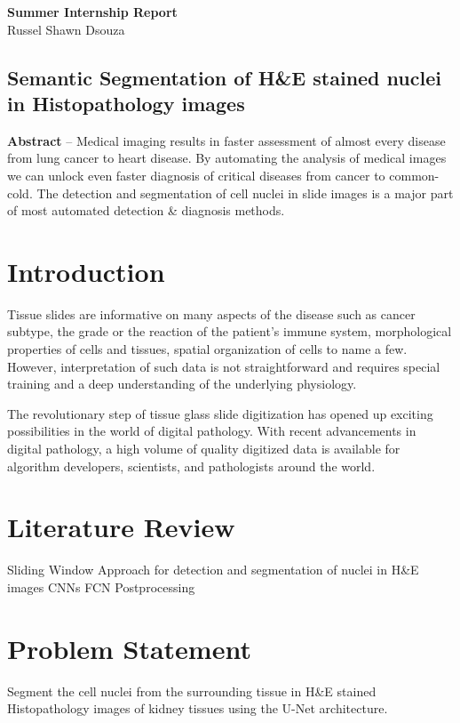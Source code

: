 \documentclass[11pt]{article}
\theoremstyle{definition}
\begin{document}
  \thispagestyle{empty}
  \begin{center}
    {\LARGE \bf Summer Internship Report}\\
    {\large Russel Shawn Dsouza}\\
  \end{center}
  
  \tableofcontents
  
  \newpage
  \begin{center}
    \section*{Semantic Segmentation of H\&E stained nuclei in Histopathology images}
      \textbf{Abstract} --
      Medical imaging results in faster assessment of almost every disease from lung cancer to heart disease. By automating the analysis of medical images we can unlock even faster diagnosis of critical diseases from cancer to common-cold. The detection and segmentation of cell nuclei in slide images is a major part of most automated detection \& diagnosis methods.
  \end{center}

  \section{Introduction}
    Tissue slides are informative on many aspects of the disease such as cancer subtype, the grade or the reaction of the patient's immune system, morphological properties of cells and tissues, spatial organization of cells to name a few.
    However, interpretation of such data is not straightforward and requires special training and a deep understanding of the underlying physiology.

    The revolutionary step of tissue glass slide digitization has opened up exciting possibilities in the world of digital pathology. 
    With recent advancements in digital pathology, a high volume of quality digitized data is available for algorithm developers, scientists, and pathologists around the world.\cite{DLInDigitalPathology}

  \section{Literature Review}
    Sliding Window Approach for detection and segmentation of nuclei in H\&E images
    CNNs
    FCN\cite{Long2015FullyCN}
    Postprocessing

  \newpage
  \section{Problem Statement}
    Segment the cell nuclei from the surrounding tissue in H\&E stained Histopathology images of kidney tissues using the U-Net architecture\cite{Ronneberger2015UNetCN}.
\end{document}
